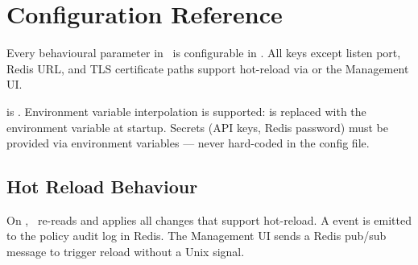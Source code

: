 
\chapter{Configuration Reference}
\label{ch:configuration}

\begin{chapterquote}
Every behavioural parameter in \ja\ is configurable in .
All keys except listen port, Redis URL, and TLS certificate paths support
hot-reload via  or the Management UI.
\end{chapterquote}

 is . Environment variable
interpolation is supported:  is replaced with the environment
variable at startup. Secrets (API keys, Redis password) must be provided via
environment variables — never hard-coded in the config file.

\section{Hot Reload Behaviour}

On , \ja\ re-reads  and applies all changes that
support hot-reload. A  event is emitted to the policy audit log
in Redis. The Management UI sends a Redis pub/sub message to trigger reload without
a Unix signal.

